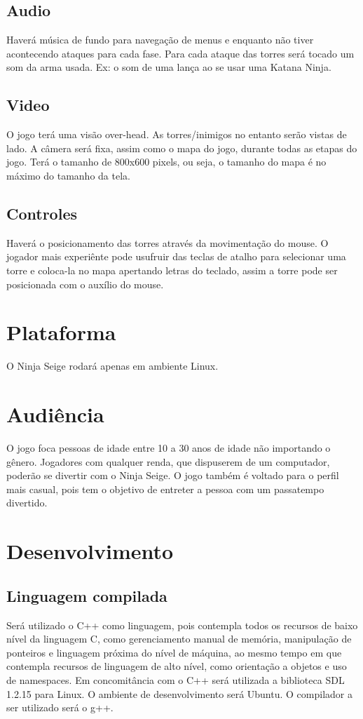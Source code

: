 \documentclass[12pt,a4paper]{article}
\begin{document}
\subsection{Audio}
Haverá música de fundo para navegação de menus e enquanto não tiver acontecendo ataques
para cada fase. Para cada ataque das torres será tocado um som da arma usada. Ex: o som de uma lança
ao se usar uma Katana Ninja.
\subsection{Video}
O jogo terá uma visão over-head. As torres/inimigos no entanto serão vistas de lado. A câmera
será fixa, assim como o mapa do jogo, durante todas as etapas do jogo. Terá o tamanho de 800x600
pixels, ou seja, o tamanho do mapa é no máximo do tamanho da tela.
\subsection{Controles}
Haverá o posicionamento das torres através da movimentação do mouse. O jogador mais
experiênte pode usufruir das teclas de atalho para selecionar uma torre e coloca-la no mapa apertando
letras do teclado, assim a torre pode ser posicionada com o auxílio do mouse.

\section{Plataforma}
	O Ninja Seige rodará apenas em ambiente Linux.

\section{Audiência}
	O jogo foca pessoas de idade entre 10 a 30 anos de idade não importando o gênero. Jogadores
com qualquer renda, que dispuserem de um computador, poderão se divertir com o Ninja Seige. O jogo
também é voltado para o perfil mais casual, pois tem o objetivo de entreter a pessoa com um
passatempo divertido.

\section{Desenvolvimento}
\subsection{Linguagem compilada}
	Será utilizado o C++ como linguagem, pois contempla todos os recursos de baixo nível da
linguagem C, como gerenciamento manual de memória, manipulação de ponteiros e linguagem próxima
do nível de máquina, ao mesmo tempo em que contempla recursos de linguagem de alto nível, como
orientação a objetos e uso de namespaces. Em concomitância com o C++ será utilizada a biblioteca SDL
1.2.15 para Linux. O ambiente de desenvolvimento será Ubuntu. O compilador a ser utilizado será o g++.
\end{document}
